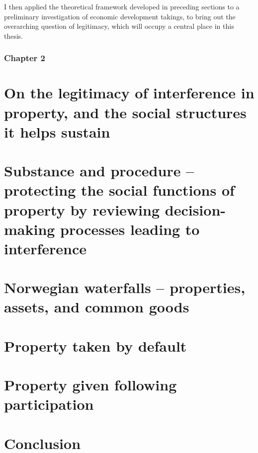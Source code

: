 I then applied the theoretical framework developed in preceding sections to a preliminary investigation of economic development takings, to bring out the overarching question of legitimacy, which will occupy a central place in this thesis.

\subsubsection{Chapter 2}



\section{On the legitimacy of interference in property, and the social structures it helps sustain}

\section{Substance and procedure -- protecting the social functions of property by reviewing decision-making processes leading to interference} 

\section{Norwegian waterfalls -- properties, assets, and common goods}

\section{Property taken by default}

\section{Property given following participation}

\section{Conclusion}



